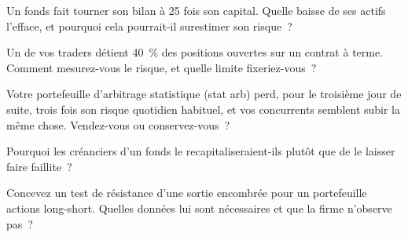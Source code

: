 \begin{interviewq}\label{iq:fm:case-studies-i:2}
Un fonds fait tourner son bilan à 25 fois son capital. Quelle baisse de ses actifs l'efface, et pourquoi cela pourrait-il surestimer son risque~?
\end{interviewq}

\begin{interviewq}\label{iq:fm:case-studies-i:3}
Un de vos traders détient 40~\% des positions ouvertes sur un contrat à terme. Comment mesurez-vous le risque, et quelle limite fixeriez-vous~?
\end{interviewq}

\begin{interviewq}\label{iq:fm:case-studies-i:4}
Votre portefeuille d'arbitrage statistique (stat arb) perd, pour le troisième jour de suite, trois fois son risque quotidien habituel, et vos concurrents semblent
subir la même chose. Vendez-vous ou conservez-vous~?
\end{interviewq}

\begin{interviewq}\label{iq:fm:case-studies-i:5}
Pourquoi les créanciers d'un fonds le recapitaliseraient-ils plutôt que de le laisser faire faillite~?
\end{interviewq}

\begin{interviewq}\label{iq:fm:case-studies-i:6}
Concevez un test de résistance d'une sortie encombrée pour un portefeuille actions long-short. Quelles données lui sont nécessaires et que la firme n'observe pas~?
\end{interviewq}
